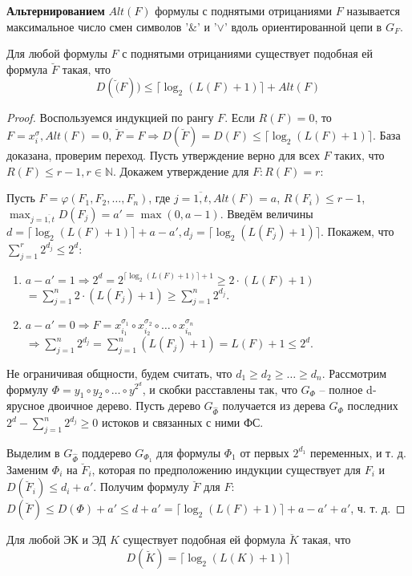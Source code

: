 \documentclass[11pt]{article}
\newcounter{th}\setcounter{th}{0}
\newcounter{cnsqnc}\setcounter{cnsqnc}{0}
\def\cnsqnc{\par\smallskip\refstepcounter{cnsqnc}\textbf{\arabic{cnsqnc}}}
\newtheorem*{Consequence}{Следствие \cnsqnc}
\newcounter{stnmt}\setcounter{stnmt}{0}
\def\st{\par\smallskip\refstepcounter{stnmt}\textbf{\arabic{stnmt}}}
\newtheorem*{Statement}{Утверждение \st}
\begin{document}
\textbf{Альтернированием} $Alt(F)$ формулы с поднятыми отрицаниями $F$ называется максимальное
число смен символов '$\&$' и '$\vee$' вдоль ориентированной цепи в $G_F$.
\begin{Statement}
Для любой формулы $F$ с поднятыми отрицаниями существует подобная ей формула $\breve{F}$ такая,
что
\begin{equation}
D(\breve(F)) \leq \lceil\log_2(L(F) + 1)\rceil + Alt(F)
\end{equation}
\end{Statement}
\begin{proof}
Воспользуемся индукцией по рангу $F$. Если $R(F) = 0$, то $F = x_i^{\sigma}, Alt(F) = 0$,
$\breve{F} = F \Rightarrow D(\breve{F}) = D(F) \leq \lceil\log_2(L(F) + 1)\rceil$. База доказана,
проверим переход. Пусть утверждение верно для всех $F$ таких, что $R(F) \leq r - 1, r \in \mathbb{N}$.
Докажем утверждение для $F: R(F) = r$:

Пусть $F = \varphi(F_1, F_2, \ldots, F_n)$, где $j = \overline{1, t}, Alt(F) = a$, $R(F_i) \leq r - 1$,
$\max_{j = \overline{1, t}}D(F_j) = a' = \max(0, a - 1)$. Введём величины
$d = \lceil\log_2(L(F) + 1)\rceil + a - a', d_j = \lceil\log_2(L(F_j) + 1)\rceil$.
Покажем, что $\sum_{j = 1}^r2^{d_j} \leq 2^d$:
\begin{enumerate}
\item $a - a' = 1 \Rightarrow 2^d = 2^{\lceil\log_2(L(F) + 1)\rceil + 1} \geq 2\cdot(L(F) + 1)$
$ = \sum_{j = 1}^n2\cdot(L(F_j) + 1) \geq \sum_{j = 1}^n2^{d_j}$.
\item $a - a' = 0 \Rightarrow F = x_{i_1}^{\sigma_1} \circ x_{i_2}^{\sigma_2} \circ \ldots \circ x_{i_n}^{\sigma_n}$
$\Rightarrow \sum_{j = 1}^n2^{d_j} = \sum_{j = 1}^n(L(F_j) + 1) = L(F) + 1 \leq 2^d$.
\end{enumerate}
Не ограничивая общности, будем считать, что $d_1 \geq d_2 \geq \ldots \geq d_n$. Рассмотрим
формулу $\Phi = y_1 \circ y_2 \circ \ldots \circ y^{2^d}$, и скобки расставлены так, что
$G_{\Phi}$ -- полное d-ярусное двоичное дерево. Пусть дерево $G_{\hat{\Phi}}$ получается из
дерева $G_{\Phi}$ последних $2^d - \sum_{j = 1}^n2^{d_j} \geq 0$ истоков и связанных с ними ФС.

Выделим в $G_{\hat{\Phi}}$ поддерево $G_{\Phi_1}$ для формулы $\Phi_1$ от первых $2^{d_1}$
переменных, и т. д. Заменим $\Phi_i$ на $\breve{F}_i$, которая по предположению индукции
существует для $F_i$ и $D(\breve{F}_i) \leq d_i + a'$. Получим формулу $\breve{F}$ для $F$:
$D(\breve{F}) \leq D(\Phi) + a' \leq d + a' = \lceil\log_2(L(F) + 1)\rceil + a - a' + a'$, ч. т. д.
\end{proof}
\begin{Consequence}
Для любой ЭК и ЭД $K$ существует подобная ей формула $\breve{K}$ такая, что
\begin{equation}
D(\breve{K}) = \lceil\log_2(L(K) + 1)\rceil
\end{equation}
\end{Consequence}
\end{document}

